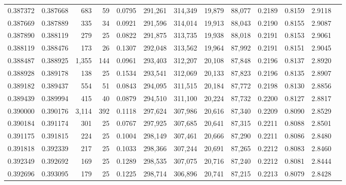 \begin{tabular}{rrrrrrrrrrrrr}
0.387372 & 0.387668 &   683 &  59 &                                     0.0795 & 291,261 & 314,349 &  19,879 &  88,077 & 0.2189 & 0.8159 & 2.9118 \\
0.387669 & 0.387889 &   335 &  34 &                                     0.0921 & 291,596 & 314,014 &  19,913 &  88,043 & 0.2190 & 0.8155 & 2.9087 \\
0.387890 & 0.388119 &   279 &  25 &                                     0.0822 & 291,875 & 313,735 &  19,938 &  88,018 & 0.2191 & 0.8153 & 2.9061 \\
0.388119 & 0.388476 &   173 &  26 &                                     0.1307 & 292,048 & 313,562 &  19,964 &  87,992 & 0.2191 & 0.8151 & 2.9045 \\
0.388487 & 0.388925 & 1,355 & 144 &                                     0.0961 & 293,403 & 312,207 &  20,108 &  87,848 & 0.2196 & 0.8137 & 2.8920 \\
0.388928 & 0.389178 &   138 &  25 &                                     0.1534 & 293,541 & 312,069 &  20,133 &  87,823 & 0.2196 & 0.8135 & 2.8907 \\
0.389182 & 0.389437 &   554 &  51 &                                     0.0843 & 294,095 & 311,515 &  20,184 &  87,772 & 0.2198 & 0.8130 & 2.8856 \\
0.389439 & 0.389994 &   415 &  40 &                                     0.0879 & 294,510 & 311,100 &  20,224 &  87,732 & 0.2200 & 0.8127 & 2.8817 \\
0.390000 & 0.390176 & 3,114 & 392 &                                     0.1118 & 297,624 & 307,986 &  20,616 &  87,340 & 0.2209 & 0.8090 & 2.8529 \\
0.390184 & 0.391174 &   301 &  25 &                                     0.0767 & 297,925 & 307,685 &  20,641 &  87,315 & 0.2211 & 0.8088 & 2.8501 \\
0.391175 & 0.391815 &   224 &  25 &                                     0.1004 & 298,149 & 307,461 &  20,666 &  87,290 & 0.2211 & 0.8086 & 2.8480 \\
0.391818 & 0.392339 &   217 &  25 &                                     0.1033 & 298,366 & 307,244 &  20,691 &  87,265 & 0.2212 & 0.8083 & 2.8460 \\
0.392349 & 0.392692 &   169 &  25 &                                     0.1289 & 298,535 & 307,075 &  20,716 &  87,240 & 0.2212 & 0.8081 & 2.8444 \\
0.392696 & 0.393095 &   179 &  25 &                                     0.1225 & 298,714 & 306,896 &  20,741 &  87,215 & 0.2213 & 0.8079 & 2.8428 \\

\end{tabular}
